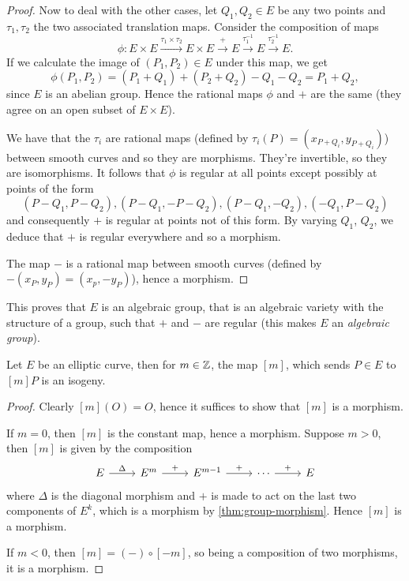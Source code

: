 \begin{proof}
	Now to deal with the other cases, let $Q_1, Q_2 \in E$ be any two points
	and $\tau_1, \tau_2$ the two associated translation maps. Consider the
	composition of maps
	\begin{equation*}
		\phi: E\times E \xrightarrow{\tau_1\times\tau_2} E \times E
		\xrightarrow{+}E\xrightarrow{\tau_1^{-1}}E\xrightarrow{\tau_2^{-1}}E.
	\end{equation*}
	If we calculate the image of $(P_1, P_2) \in E$ under this map, we get
	\begin{equation*}
		\phi(P_1, P_2) = (P_1 + Q_1) + (P_2 + Q_2) - Q_1 - Q_2 = P_1 + Q_2,
	\end{equation*}
	since $E$ is an abelian group.
	Hence the rational maps $\phi$ and $+$ are the same (they agree
	on an open subset of $E\times E$).

	We have that the $\tau_i$ are rational maps 
	(defined by $\tau_i(P) = (x_{P + Q_i}, y_{P + Q_i})$) between smooth curves
	and so they are morphisms. They're invertible, so they are isomorphisms.
	It follows that $\phi$ is regular at all
	points except possibly at points of the form
	\begin{equation*}
		(P - Q_1, P - Q_2), (P-Q_1, -P - Q_2), (P - Q_1, -Q_2), (-Q_1, P-Q_2)
	\end{equation*}
	and consequently $+$ is regular at points not of this form.
	By varying $Q_1$, $Q_2$, we deduce that $+$ is regular everywhere
	and so a morphism.

	The map $-$ is a rational map between smooth curves (defined by
	$-(x_P, y_P) = (x_p, -y_P)$), hence a morphism.
\end{proof}
This proves that $E$ is an algebraic group, that is an algebraic variety
with the structure of a group, such that $+$ and $-$ are regular (this
makes $E$ an \emph{algebraic group}).


\begin{corollary}
	Let $E$ be an elliptic curve, then for $m \in \mathbb{Z}$, the map $[m]$, which
	sends $P \in E$ to $[m]P$ is an isogeny.
\end{corollary}

\begin{proof}
	Clearly $[m](O) = O$, hence it suffices to show that $[m]$ is a morphism.

	If $m = 0$, then $[m]$ is the constant map, hence a morphism.
	Suppose $m > 0$, then $[m]$ is given by the composition
	\begin{equation*}
		\begin{tikzcd}
			E & {E^m} & {E^{m-1}} & \cdots & E
			\arrow["{\Delta}", from=1-1, to=1-2]
			\arrow["{+}", from=1-2, to=1-3]
			\arrow["+", from=1-3, to=1-4]
			\arrow["+", from=1-4, to=1-5]
		\end{tikzcd}
	\end{equation*}
	where $\Delta$ is the diagonal morphism and $+$ is made to act on the
	last two components of $E^k$, which is a morphism by
	\ref{thm:group-morphism}. Hence $[m]$ is a morphism.

	If $m < 0$, then $[m] = (-)\circ[-m]$, so being a composition of two
	morphisms, it is a morphism.
\end{proof}


